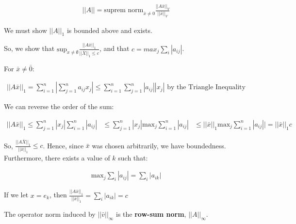 \begin{align*}
  ||A|| = \text{suprem norm}_{\bar{x} \neq 0} \frac{||A\bar{x}||_V}{||\bar{x}||_V}
\end{align*}

We must show $||A||_1$ is bounded above and exists.

So, we show that $\text{sup}_{x \neq \emptyset} \frac{||A\bar{x}||_1}{||\bar{X}||_1 \leq c}$, and that $c = max_j \sum_i |a_{ij}|$.

For $\bar{x} \neq \bar{0}$:

\begin{align*}
  ||A\bar{x}||_1 = \sum_{i=1}^n |\sum_{j=1}^n a_{ij} x_j| \leq \sum_{i=1}^n \sum_{j=1}^n |a_{ij}| |x_j|\text{ by the Triangle Inequality}
\end{align*}

We can reverse the order of the sum:

\begin{align*}
  ||A\bar{x}||_1 \leq \sum_{j=1}^n |x_j| \sum_{i=1}^n |a_{ij}| &\leq \sum_{j=1}^n |x_j| \text{max}_j \sum_{i=1}^n |a_{ij}|
  &\leq ||\bar{x}||_1 \text{max}_j \sum_{i=1}^n |a_{ij}|| = ||\bar{x}||_1 c
\end{align*}

So, $\frac{||A\bar{X}||_1}{||\bar{x}||_1} \leq c$. Hence, since $\bar{x}$ was chosen arbitrarily, we have boundedness. Furthermore, there exists a value of $k$ such that:

\begin{align*}
  \text{max}_j \sum_i |a_{ij}| = \sum_i |a_{ik}|
\end{align*}

If we let $x = e_k$, then $\frac{||A\bar{x}||_1}{||\bar{x}||_1} = \sum_i |a_{ik}| = c$

The operator norm induced by $||\bar{v}||_\infty$ is the \textbf{row-sum norm}, $||A||_\infty$.